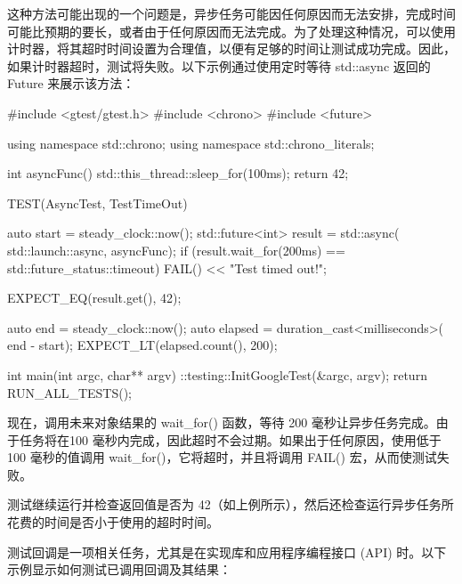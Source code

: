 
这种方法可能出现的一个问题是，异步任务可能因任何原因而无法安排，完成时间可能比预期的要长，或者由于任何原因而无法完成。为了处理这种情况，可以使用计时器，将其超时时间设置为合理值，以便有足够的时间让测试成功完成。因此，如果计时器超时，测试将失败。以下示例通过使用定时等待 std::async 返回的 Future 来展示该方法：

\begin{cpp}
#include <gtest/gtest.h>
#include <chrono>
#include <future>

using namespace std::chrono;
using namespace std::chrono_literals;

int asyncFunc() {
    std::this_thread::sleep_for(100ms);
    return 42;
}

TEST(AsyncTest, TestTimeOut) {
    auto start = steady_clock::now();
    std::future<int> result = std::async(
                            std::launch::async,
                            asyncFunc);
    if (result.wait_for(200ms) ==
                std::future_status::timeout) {
        FAIL() << "Test timed out!";
    }

    EXPECT_EQ(result.get(), 42);

    auto end = steady_clock::now();
    auto elapsed = duration_cast<milliseconds>(
                                end - start);
    EXPECT_LT(elapsed.count(), 200);
}

int main(int argc, char** argv) {
    ::testing::InitGoogleTest(&argc, argv);
    return RUN_ALL_TESTS();
}
\end{cpp}

现在，调用未来对象结果的 wait\_for() 函数，等待 200 毫秒让异步任务完成。由于任务将在100 毫秒内完成，因此超时不会过期。如果出于任何原因，使用低于 100 毫秒的值调用 wait\_for()，它将超时，并且将调用 FAIL() 宏，从而使测试失败。

测试继续运行并检查返回值是否为 42（如上例所示），然后还检查运行异步任务所花费的时间是否小于使用的超时时间。


测试回调是一项相关任务，尤其是在实现库和应用程序编程接口 (API) 时。以下示例显示如何测试已调用回调及其结果：

